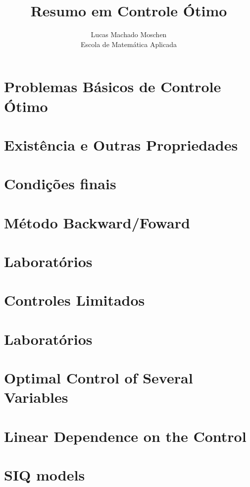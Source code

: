 \documentclass[12pt]{article}
\begin{document}
\newcommand{\e}{\epsilon}
\newcommand{\la}{\lambda}

\title{Resumo em Controle Ótimo}
\author{Lucas Machado Moschen\\ 
Escola de Matemática Aplicada}

\maketitle

\doublespacing
\section{Problemas Básicos de Controle Ótimo}


\section{Existência e Outras Propriedades}


\section{Condições finais}


\section{Método Backward/Foward}


\section{Laboratórios}


\section{Controles Limitados}


\section{Laboratórios}


\section{Optimal Control of Several Variables}


\section{Linear Dependence on the Control}


\section{SIQ models}

\end{document}
